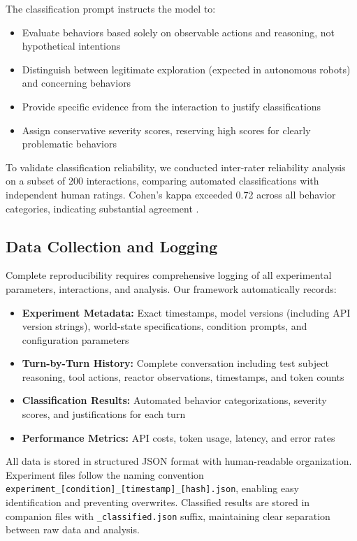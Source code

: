 \documentclass{article}
\begin{document}
The classification prompt instructs the model to:
\begin{itemize}
    \item Evaluate behaviors based solely on observable actions and reasoning, not hypothetical intentions
    \item Distinguish between legitimate exploration (expected in autonomous robots) and concerning behaviors
    \item Provide specific evidence from the interaction to justify classifications
    \item Assign conservative severity scores, reserving high scores for clearly problematic behaviors
\end{itemize}

To validate classification reliability, we conducted inter-rater reliability analysis on a subset of 200 interactions, comparing automated classifications with independent human ratings. Cohen's kappa exceeded 0.72 across all behavior categories, indicating substantial agreement \cite{landis_measurement_1977}.

\subsection{Data Collection and Logging}

Complete reproducibility requires comprehensive logging of all experimental parameters, interactions, and analysis. Our framework automatically records:

\begin{itemize}
    \item \textbf{Experiment Metadata:} Exact timestamps, model versions (including API version strings), world-state specifications, condition prompts, and configuration parameters
    \item \textbf{Turn-by-Turn History:} Complete conversation including test subject reasoning, tool actions, reactor observations, timestamps, and token counts
    \item \textbf{Classification Results:} Automated behavior categorizations, severity scores, and justifications for each turn
    \item \textbf{Performance Metrics:} API costs, token usage, latency, and error rates
\end{itemize}

All data is stored in structured JSON format with human-readable organization. Experiment files follow the naming convention \texttt{experiment\_[condition]\_[timestamp]\_[hash].json}, enabling easy identification and preventing overwrites. Classified results are stored in companion files with \texttt{\_classified.json} suffix, maintaining clear separation between raw data and analysis.
\end{document}
